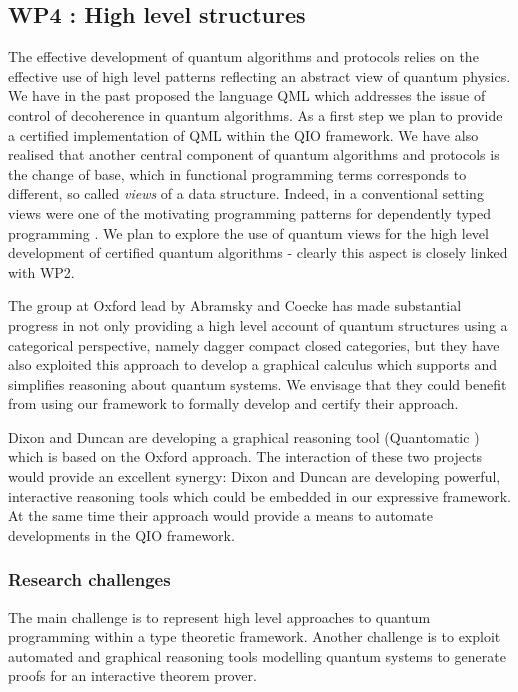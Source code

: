 \documentclass[a4paper]{article}
\begin{document}
\subsection*{WP4 : High level structures}
\label{sec:wp4}

The effective development of quantum algorithms and protocols relies
on the effective use of high level patterns reflecting an abstract
view of quantum physics. We have in the past proposed the language QML
which addresses the issue of control of decoherence in quantum
algorithms. As a first step we plan to provide a certified
implementation of QML within the QIO framework. We have also realised
that another central component of quantum algorithms and protocols is
the change of base, which in functional programming terms corresponds
to different, so called \emph{views} of a data structure. Indeed, in a
conventional setting views were one of the motivating programming
patterns for dependently typed programming . We plan to
explore the use of quantum views for the high level development of
certified quantum algorithms - clearly this aspect is closely linked
with WP2. 

The group at Oxford lead by Abramsky and Coecke has made substantial
progress in not only providing a high level account of quantum
structures using a categorical perspective, namely dagger compact
closed categories, but they have also exploited this approach to
develop a graphical calculus which supports and simplifies reasoning
about quantum systems. We envisage that they could benefit from using
our framework to formally develop and certify their approach.

Dixon and Duncan are developing a graphical reasoning tool
(Quantomatic ) which is based on the Oxford approach. 
The interaction
of these two projects would provide an excellent synergy: Dixon and
Duncan are developing powerful, interactive reasoning tools which could
be embedded in our expressive framework. At the same time their
approach would provide a means to automate developments in the QIO
framework. 

\subsubsection*{Research challenges}

The main challenge is to represent high level approaches to quantum
programming within a type theoretic framework. Another challenge is to
exploit automated and graphical reasoning tools modelling quantum
systems to generate proofs for an interactive theorem prover. 
\end{document}
